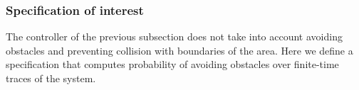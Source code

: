 
\subsubsection{Specification of interest}
The controller of the previous subsection does not take into account avoiding obstacles and preventing collision with boundaries of the area. Here we define a specification that computes probability of avoiding obstacles over finite-time traces of the system. 

